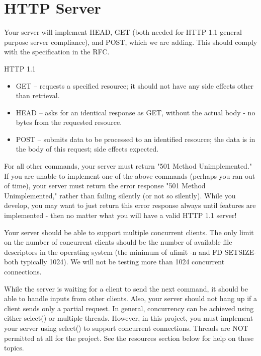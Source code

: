 \documentclass[12pt]{article}
\begin{document}
\section{HTTP Server}

Your server will implement HEAD, GET (both needed for HTTP 1.1 general
purpose server compliance), and POST, which we are adding. This should
comply with the specification in the RFC.

HTTP 1.1
\begin{itemize}
\item  GET – requests a specified resource; it should not have any
side effects other than retrieval.

\item  HEAD – asks for an identical response as GET, without the actual
body - no bytes from the requested resource.

\item  POST – submits data to be processed to an identified resource;
the data is in the body of this request; side effects expected.

\end{itemize}

For all other commands, your server must return "501 Method
Unimplemented." If you are unable to implement one of the above commands
(perhaps you ran out of time), your server must return the error response
"501 Method Unimplemented," rather than failing silently (or not so
silently). While you develop, you may want to just return this error
response always until features are implemented - then no matter what
you will have a valid HTTP 1.1 server!  

Your server should be able to support multiple concurrent clients.
The only limit on the number of concurrent clients should be the number
of available file descriptors in the operating system (the minimum of
ulimit -n and FD SETSIZE-both typically 1024). We will not be testing
more than 1024 concurrent connections.

While the server is waiting for a client to send the next command,
it should be able to handle inputs from other clients. Also, your
server should not hang up if a client sends only a partial request. In
general, concurrency can be achieved using either select() or multiple
threads. However, in this project, you must implement your server using
select() to support concurrent connections. Threads are NOT permitted at
all for the project. See the resources section below for help on these
topics. 
\end{document}
